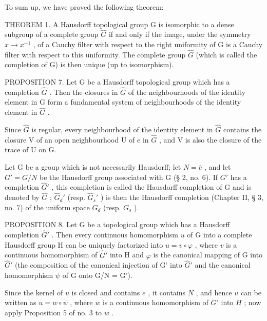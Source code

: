 To sum up, we have proved the following theorem:

THEOREM 1. A Hausdorff topological group G is isomorphic to a dense subgroup of a complete group \(\hat{G}\) if and only if the image, under the symmetry \(x \to x^{-1}\) , of a Cauchy filter with respect to the right uniformity of G is a Cauchy filter with respect to this uniformity. The complete group \(\hat{G}\) (which is called the completion of G) is then unique (up to isomorphism).

PROPOSITION 7. Let G be a Hausdorff topological group which has a completion \(\hat{G}\) . Then the closures in \(\hat{G}\) of the neighbourhoods of the identity element in G form a fundamental system of neighbourhoods of the identity element in \(\hat{G}\) .

Since \(\hat{G}\) is regular, every neighbourhood of the identity element in \(\hat{G}\) contains the closure V of an open neighbourhood U of e in \(\hat{G}\) , and V is also the closure of the trace of U on G.

Let G be a group which is not necessarily Hausdorff; let \(N = \overline{e}\) , and let \(G' = G/N\) be the Hausdorff group associated with G (§ 2, no. 6). If \(G'\) has a completion \(\hat{G}'\) , this completion is called the Hausdorff completion of G and is denoted by \(\hat{G}\) ; \(\hat{G}_{d}'\) (resp. \(\hat{G}_{s}'\) ) is then the Hausdorff completion (Chapter II, § 3, no. 7) of the uniform space \(G_{d}\) (resp. \(G_{s}\) ).

PROPOSITION 8. Let G be a topological group which has a Hausdorff completion \(\hat{G}'\) . Then every continuous homomorphism \(u\) of G into a complete Hausdorff group H can be uniquely factorized into \(u = v \circ \varphi\) , where \(v\) is a continuous homomorphism of \(\hat{G}'\) into H and \(\varphi\) is the canonical mapping of G into \(\hat{G}'\) (the composition of the canonical injection of G' into \(\hat{G}'\) and the canonical homomorphism \(\psi\) of G onto G/N = G').

Since the kernel of \(u\) is closed and contains \(e\) , it contains \(N\) , and hence \(u\) can be written as \(u = w \circ \psi\) , where \(w\) is a continuous homomorphism of \(G'\) into \(H\) ; now apply Proposition 5 of no. 3 to \(w\) .

